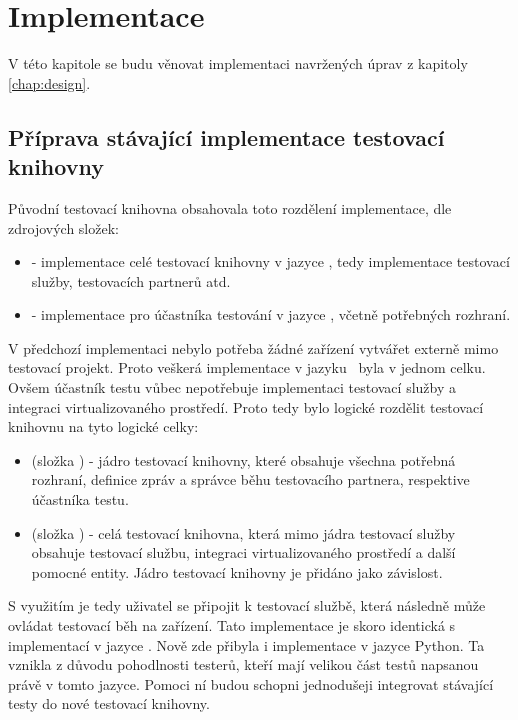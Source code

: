 \chapter{Implementace}\label{chap:implementation}

V této kapitole se budu věnovat implementaci navržených úprav z kapitoly \ref{chap:design}.


\section{Příprava stávající implementace testovací knihovny}
Původní testovací knihovna obsahovala toto rozdělení implementace, dle zdrojových složek:

\begin{itemize}
    \item {} - implementace celé testovací knihovny v jazyce \csharp, tedy implementace testovací služby, testovacích partnerů atd.
    \item {} - implementace pro účastníka testování v jazyce \cpp, včetně potřebných rozhraní.
\end{itemize}

V předchozí implementaci nebylo potřeba žádné zařízení vytvářet externě mimo testovací projekt. Proto veškerá implementace v jazyku \csharp\, byla v jednom celku. Ovšem účastník testu vůbec nepotřebuje implementaci testovací služby a integraci virtualizovaného prostředí. Proto tedy bylo logické rozdělit testovací knihovnu na tyto logické celky:

\begin{itemize}
    \item {} (složka ) - jádro testovací knihovny, které obsahuje všechna potřebná rozhraní, definice zpráv a správce běhu testovacího partnera, respektive účastníka testu.
    \item {} (složka ) - celá testovací knihovna, která mimo jádra testovací služby obsahuje testovací službu, integraci virtualizovaného prostředí a další pomocné entity. Jádro testovací knihovny je přidáno jako závislost. 
\end{itemize}

S využitím  je tedy uživatel se připojit k testovací službě, která následně může ovládat testovací běh na zařízení. Tato implementace je skoro identická s implementací v jazyce \cpp. Nově zde přibyla i implementace v jazyce Python. Ta vznikla z důvodu pohodlnosti testerů, kteří mají velikou část testů napsanou právě v tomto jazyce. Pomoci ní budou schopni jednodušeji integrovat stávající testy do nové testovací knihovny. 


